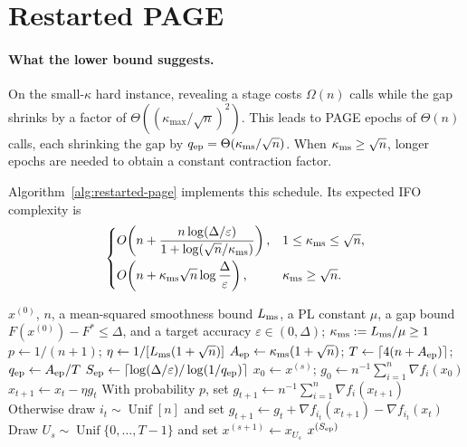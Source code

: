 \documentclass{article}
\theoremstyle{definition}
\begin{document}
\section{Restarted PAGE}
\label{sec:restarted-page}

\paragraph{What the lower bound suggests.}
On the small-$\kappa$ hard instance, revealing a stage costs $\Omega(n)$ calls
while the gap shrinks by a factor of $\Theta((\kappa_{\max}/\sqrt n)^2)$.  This leads to
PAGE epochs of $\Theta(n)$ calls, each shrinking the gap by
$q_{\rm ep}=\Theta(\kappa_{\rm ms}/\sqrt n)$.  When
$\kappa_{\rm ms}\ge\sqrt n$, longer epochs are needed to obtain a constant
contraction factor.

Algorithm~\ref{alg:restarted-page} implements this schedule.  Its expected IFO
complexity is
\begin{equation}
 \begin{cases}
 \displaystyle O\!\left(n+\frac{n\log(\Delta/\varepsilon)}
 {1+\log(\sqrt n/\kappa_{\rm ms})}\right),
 &1\le\kappa_{\rm ms}\le\sqrt n,\\[3mm]
 \displaystyle O\!\left(n+\kappa_{\rm ms}\sqrt n
 \log\frac{\Delta}{\varepsilon}\right),
 &\kappa_{\rm ms}\ge\sqrt n.
 \end{cases}
 \label{eq:restarted-page-main-rate}
\end{equation}
\begingroup
\setlength{\intextsep}{7pt plus 1pt minus 1pt}
\begin{algorithm}[!ht]
\caption{Restarted PAGE}
\label{alg:restarted-page}
\footnotesize
\begin{algorithmic}[1]
\Require $x^{(0)}$, $n$, a mean-squared smoothness bound $L_{\rm ms}$, a PL
  constant $\mu$, a gap bound $F(x^{(0)})-F^*\le\Delta$, and a target accuracy
  $\varepsilon\in(0,\Delta)$;
  $\kappa_{\rm ms}:=L_{\rm ms}/\mu\ge1$
\State $p\gets1/(n+1)$; $\eta\gets1/[L_{\rm ms}(1+\sqrt n)]$
\State $A_{\rm ep}\gets\kappa_{\rm ms}(1+\sqrt n)$;
  $T\gets\lceil4(n+A_{\rm ep})\rceil$; $q_{\rm ep}\gets A_{\rm ep}/T$
\State $S_{\rm ep}\gets\left\lceil
  \log(\Delta/\varepsilon)/\log(1/q_{\rm ep})\right\rceil$
  \State $x_0\gets x^{(s)}$;
    $g_0\gets n^{-1}\sum_{i=1}^n\nabla f_i(x_0)$
    \State $x_{t+1}\gets x_t-\eta g_t$
    \State With probability $p$, set
      $g_{t+1}\gets n^{-1}\sum_{i=1}^n\nabla f_i(x_{t+1})$
    \State Otherwise draw $i_t\sim\operatorname{Unif}[n]$ and set
      $g_{t+1}\gets g_t+\nabla f_{i_t}(x_{t+1})-\nabla f_{i_t}(x_t)$
    \EndIf
  \EndFor
  \State Draw $U_s\sim\operatorname{Unif}\{0,\ldots,T-1\}$ and set
    $x^{(s+1)}\gets x_{U_s}$
\EndFor
\State \Return $x^{(S_{\rm ep})}$
\end{algorithmic}
\end{algorithm}
\endgroup
\end{document}
